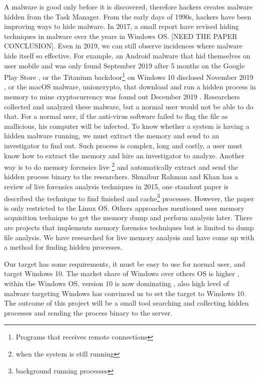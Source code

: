 A malware is good only before it is discovered, therefore hackers creates malware hidden from the Task Manager. From the early days of 1990s, hackers have been improving ways to hide malware. In 2017, a small report \cite{evolutionHidding} have revised hiding techniques in malware over the years in Windows OS. [NEED THE PAPER CONCLUSION]. Even in 2019, we can still observe incidences where malware hide itself so effective. For example, an Android malware that hid themselves on user mobile and was only found September 2019 after 5 months on the Google Play Store \cite{hiddenMalwareAndroid}, or the Titanium backdoor\footnote{Programs that receives remote connections} on Windows 10 disclosed November 2019 \cite{titanium}, or the macOS malware, unioncrypto, that download and run a hidden process in memory to mine cryptocurrency was found out December 2019 \cite{unioncrypto}. Researchers collected and analyzed these malware, but a normal user would not be able to do that. For a normal user, if the anti-virus software failed to flag the file as mallicious, his computer will be infected. To know whether a system is having a hidden malware running, we must extract the memory and send to an investigator to find out. Such process is complex, long and costly, a user must know how to extract the memory and hire an investigator to analyze. Another way is to do memory forensics live \footnote{when the system is still running} and automatically extract and send the hidden process binary to the researchers. Shuaibur Rahman and Khan \cite{reviewLive} has a review of live forensics analysis techniques in 2015, one standout paper is \cite{comparativeLive} described the technique to find finished and cache\footnote{background running processes} processes. However, the paper is only restricted to the Linux OS. Others approaches mentioned uses memory acquisition technique to get the memory dump and perform analysis later. There are projects that implements memory forensics techniques but is limited to dump file analysis. We have researched for live memory analysis and have come up with a method for finding hidden processes.

Our target has some requirements, it must be easy to use for normal user, and target Windows 10. The market share of Windows over others OS is higher \cite{osMarketShare}, within the Windows OS, version 10 is now dominating \cite{windowsShare}, also high level of malware targeting Windows has convinced us to set the target to Windows 10. The outcome of this project will be a small tool searching and collecting hidden processes and sending the process binary to the server.

